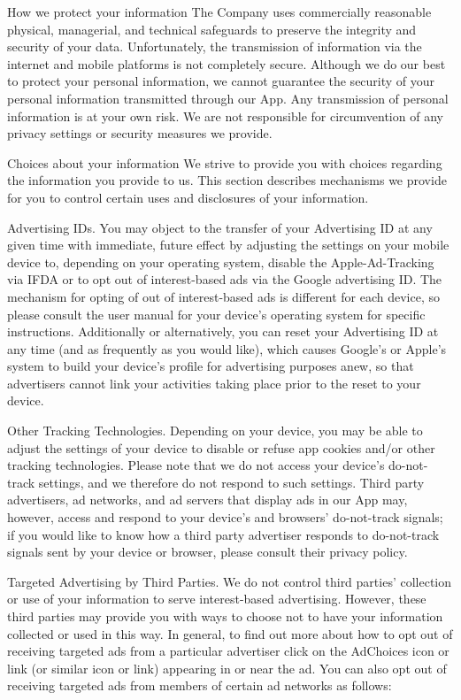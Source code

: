 How we protect your information
The Company uses commercially reasonable physical, managerial, and technical safeguards to preserve the integrity and security of your data. Unfortunately, the transmission of information via the internet and mobile platforms is not completely secure. Although we do our best to protect your personal information, we cannot guarantee the security of your personal information transmitted through our App. Any transmission of personal information is at your own risk. We are not responsible for circumvention of any privacy settings or security measures we provide.

Choices about your information
We strive to provide you with choices regarding the information you provide to us. This section describes mechanisms we provide for you to control certain uses and disclosures of your information.

Advertising IDs. You may object to the transfer of your Advertising ID at any given time with immediate, future effect by adjusting the settings on your mobile device to, depending on your operating system, disable the Apple-Ad-Tracking via IFDA or to opt out of interest-based ads via the Google advertising ID. The mechanism for opting of out of interest-based ads is different for each device, so please consult the user manual for your device’s operating system for specific instructions. Additionally or alternatively, you can reset your Advertising ID at any time (and as frequently as you would like), which causes Google’s or Apple’s system to build your device’s profile for advertising purposes anew, so that advertisers cannot link your activities taking place prior to the reset to your device.

Other Tracking Technologies. Depending on your device, you may be able to adjust the settings of your device to disable or refuse app cookies and/or other tracking technologies. Please note that we do not access your device’s do-not-track settings, and we therefore do not respond to such settings. Third party advertisers, ad networks, and ad servers that display ads in our App may, however, access and respond to your device’s and browsers’ do-not-track signals; if you would like to know how a third party advertiser responds to do-not-track signals sent by your device or browser, please consult their privacy policy.

Targeted Advertising by Third Parties. We do not control third parties’ collection or use of your information to serve interest-based advertising. However, these third parties may provide you with ways to choose not to have your information collected or used in this way. In general, to find out more about how to opt out of receiving targeted ads from a particular advertiser click on the AdChoices icon or link (or similar icon or link) appearing in or near the ad.  You can also opt out of receiving targeted ads from members of certain ad networks as follows:


